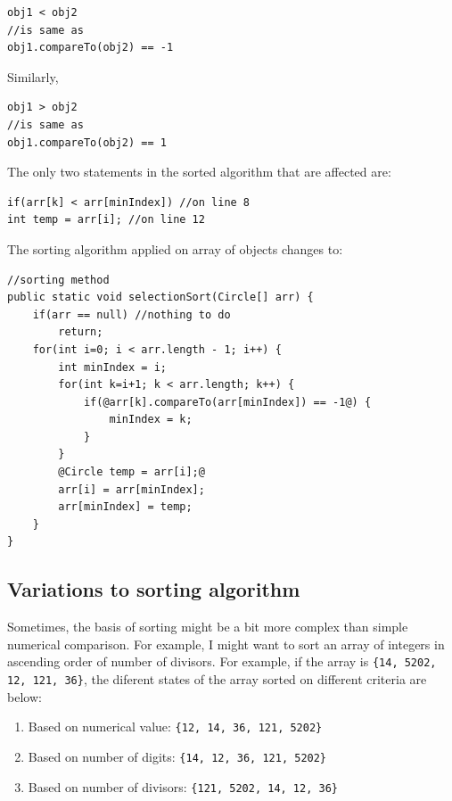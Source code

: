 \begin{lstlisting}
obj1 < obj2
//is same as
obj1.compareTo(obj2) == -1
\end{lstlisting}

Similarly, 

\begin{lstlisting}
obj1 > obj2
//is same as
obj1.compareTo(obj2) == 1
\end{lstlisting}

The only two statements in the sorted algorithm that are affected are:

\begin{lstlisting}
if(arr[k] < arr[minIndex]) //on line 8
int temp = arr[i]; //on line 12
\end{lstlisting}

The sorting algorithm applied on array of objects changes to:

\begin{lstlisting}[style=buggy]
//sorting method
public static void selectionSort(Circle[] arr) {
	if(arr == null) //nothing to do
		return;
	for(int i=0; i < arr.length - 1; i++) {
		int minIndex = i;
		for(int k=i+1; k < arr.length; k++) {
			if(@arr[k].compareTo(arr[minIndex]) == -1@) {
				minIndex = k;
			}
		}
		@Circle temp = arr[i];@
		arr[i] = arr[minIndex];
		arr[minIndex] = temp;
	}
}
\end{lstlisting}

\newpage

\subsection{Variations to sorting algorithm}

Sometimes, the basis of sorting might be a bit more complex than simple numerical comparison. For example, I might want to sort an array of integers in ascending order of number of divisors. For example, if the array is \texttt{\{14, 5202, 12, 121, 36\}}, the diferent states of the array sorted on different criteria are below:

\begin{enumerate}
\item Based on numerical value: \texttt{\{12, 14, 36, 121, 5202\}}	
\item Based on number of digits: \texttt{\{14, 12,  36, 121, 5202\}}	
\item Based on number of divisors: \texttt{\{121, 5202, 14, 12, 36\}}	
\end{enumerate}

